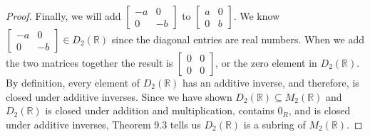 \documentclass[11 pt]{article}
\newcommand{\newpar}{\vspace{.15in}\noindent}
\begin{document}
\begin{proof}
  \newpar
  Finally, we will add $\begin{bmatrix}
    -a & 0 \\
    0 & -b
  \end{bmatrix}$ to $\begin{bmatrix}
    a & 0 \\
    0 & b
  \end{bmatrix}$. We know $\begin{bmatrix}
    -a & 0 \\
    0 & -b
  \end{bmatrix}\in D_2(\mathbb{R})$ since the diagonal entries are real numbers. When we add the two matrices together the result is $\begin{bmatrix}
    0 & 0 \\
    0 & 0
  \end{bmatrix}$, or the zero element in $D_2(\mathbb{R})$. By definition, every element of $D_2(\mathbb{R})$ has an additive inverse, and therefore, is closed under additive inverses. Since we have shown $D_2(\mathbb{R}) \subseteq M_2(\mathbb{R})$ and $D_2(\mathbb{R})$ is closed under addition and multiplication, contains $0_R$, and is closed under additive inverses, Theorem 9.3 tells us $D_2(\mathbb{R})$ is a subring of $M_2(\mathbb{R})$.




\end{proof}
\end{document}
